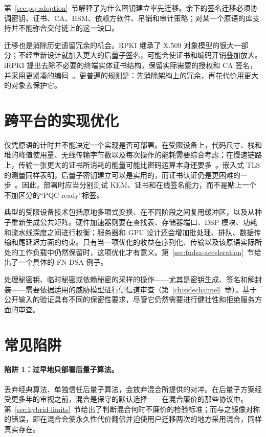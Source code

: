 第~\ref{sec:pq-adoption}~节解释了为什么密钥建立率先迁移。余下的签名迁移必须协调密钥、证书、CA、HSM、依赖方软件、吊销和审计策略；对某一个原语的库支持并不能弥合交付链上的这一缺口。

迁移也是消除历史遗留冗余的机会。RPKI 继承了 X.509 对象模型的很大一部分；不经重新设计就加入更大的后量子签名，可能会使证书和编码开销叠加放大。iRPKI 提出去除不必要的终端实体证书结构，保留实际需要的授权和 CA 签名，并采用更紧凑的编码~\cite{irpki2026}。更普遍的规则是：先消除架构上的冗余，再花代价用更大的对象去保护它。

\section{跨平台的实现优化}

仅凭原语的计时并不能决定一个实现是否可部署。在受限设备上，代码尺寸、栈和堆的峰值使用量、无线传输字节数以及每次操作的能耗需要综合考虑；在慢速链路上，传输一张更大的证书所消耗的能量可能比密码运算本身还要多~\cite{pqciotsurvey2024}。嵌入式 TLS 的测量同样表明，后量子密钥建立可以是实用的，而证书认证仍是更困难的一步~\cite{pqtlsembedded2020}。因此，部署时应当分别测试 KEM、证书和在线签名能力，而不是贴上一个不加区分的“PQC-ready”标签。

典型的受限设备技术包括原地多项式变换、在不同阶段之间复用缓冲区，以及从种子重新生成公共矩阵。硬件加速器则要在查找表、存储器端口、DSP 模块、功耗和流水线深度之间进行权衡；服务器和 GPU 设计还会增加批处理、排队、数据传输和尾延迟方面的约束。只有当一项优化的收益在序列化、传输以及该原语实际所处的工作负载中仍然保留时，这项优化才有意义。第~\ref{sec:fndsa-acceleration}~节给出了一个具体的 FN-DSA 例子。

处理秘密钥、临时秘密或依赖秘密的采样的操作——尤其是密钥生成、签名和解封装——需要依据适用的威胁模型进行侧信道审查（第~\ref{ch:sidechannel}~章）。基于公开输入的验证具有不同的保密性要求，尽管它仍然需要进行健壮性和拒绝服务方面的审查。

\section{常见陷阱}

\paragraph{陷阱 1：过早地只部署后量子算法。}
丢弃经典算法、单独信任后量子算法，会放弃混合所提供的对冲。在后量子方案经受更多年的审视之前，混合是保守的默认选择——在混合廉价的那些协议中。第~\ref{sec:hybrid-limits}~节给出了判断混合何时不廉价的检验标准；而与之镜像对称的错误，即在混合会使永久性代价翻倍并迫使用户迁移两次的地方采用混合，同样真实存在。

